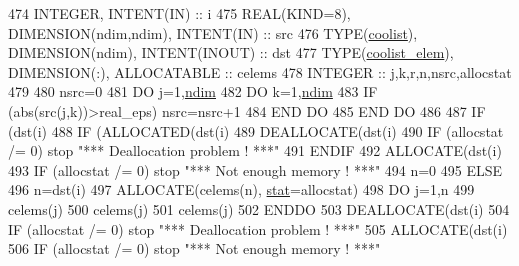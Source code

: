 \begin{DoxyCode}
474     \textcolor{keywordtype}{INTEGER}, \textcolor{keywordtype}{INTENT(IN)} :: i
475     \textcolor{keywordtype}{REAL(KIND=8)}, \textcolor{keywordtype}{DIMENSION(ndim,ndim)}, \textcolor{keywordtype}{INTENT(IN)} :: src
476     \textcolor{keywordtype}{TYPE}(\hyperlink{structtensor_1_1coolist}{coolist}), \textcolor{keywordtype}{DIMENSION(ndim)}, \textcolor{keywordtype}{INTENT(INOUT)} :: dst
477     \textcolor{keywordtype}{TYPE}(\hyperlink{structtensor_1_1coolist__elem}{coolist\_elem}), \textcolor{keywordtype}{DIMENSION(:)}, \textcolor{keywordtype}{ALLOCATABLE} :: celems
478     \textcolor{keywordtype}{INTEGER} :: j,k,r,n,nsrc,allocstat
479 
480     nsrc=0
481     \textcolor{keywordflow}{DO} j=1,\hyperlink{namespaceparams_a2323fe1773f086e20c14f266351c482b}{ndim}
482        \textcolor{keywordflow}{DO} k=1,\hyperlink{namespaceparams_a2323fe1773f086e20c14f266351c482b}{ndim}
483           \textcolor{keywordflow}{IF} (abs(src(j,k))>real\_eps) nsrc=nsrc+1
484 \textcolor{keywordflow}{       END DO}
485 \textcolor{keywordflow}{    END DO}
486 
487     \textcolor{keywordflow}{IF} (dst(i)%
488        \textcolor{keywordflow}{IF} (\textcolor{keyword}{ALLOCATED}(dst(i)%
489           \textcolor{keyword}{DEALLOCATE}(dst(i)%
490           \textcolor{keywordflow}{IF} (allocstat /= 0) stop \textcolor{stringliteral}{"*** Deallocation problem ! ***"}
491 \textcolor{keywordflow}{       ENDIF}
492        \textcolor{keyword}{ALLOCATE}(dst(i)%
493        \textcolor{keywordflow}{IF} (allocstat /= 0) stop \textcolor{stringliteral}{"*** Not enough memory ! ***"}
494        n=0
495     \textcolor{keywordflow}{ELSE}
496        n=dst(i)%
497        \textcolor{keyword}{ALLOCATE}(celems(n), \hyperlink{namespacestat}{stat}=allocstat)
498        \textcolor{keywordflow}{DO} j=1,n
499           celems(j)%
500           celems(j)%
501           celems(j)%
502 \textcolor{keywordflow}{       ENDDO}
503        \textcolor{keyword}{DEALLOCATE}(dst(i)%
504        \textcolor{keywordflow}{IF} (allocstat /= 0) stop \textcolor{stringliteral}{"*** Deallocation problem ! ***"}
505        \textcolor{keyword}{ALLOCATE}(dst(i)%
506        \textcolor{keywordflow}{IF} (allocstat /= 0) stop \textcolor{stringliteral}{"*** Not enough memory ! ***"}

\end{DoxyCode}
